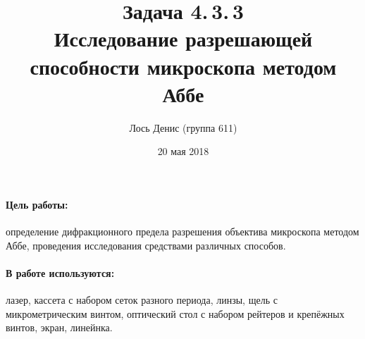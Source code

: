 \documentclass[12pt]{article}
\title{{\bf Задача 4.\,3.\,3 \\ Исследование разрешающей способности микроскопа методом Аббе}}
\author{Лось Денис (группа 611)}
\date{20 мая 2018}
\begin{document}
\maketitle

\paragraph*{Цель работы: } определение дифракционного предела разрешения объектива микроскопа методом Аббе, проведения исследования средствами различных способов.

\paragraph*{В работе используются: } лазер, кассета с набором сеток разного периода, линзы, щель с микрометрическим винтом, оптический стол с набором рейтеров и крепёжных винтов, экран, линейнка.
\end{document}
